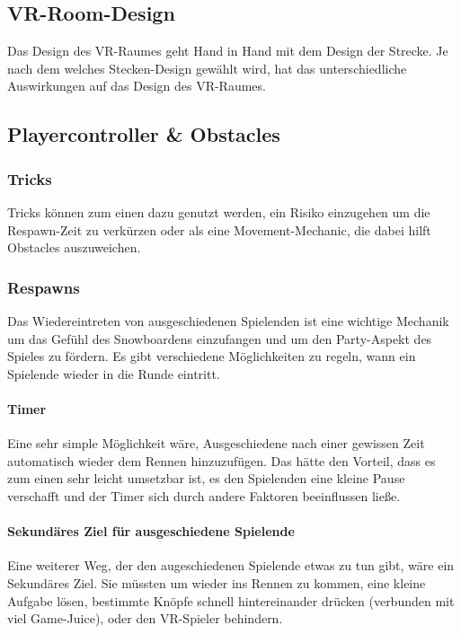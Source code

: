 \subsection{VR-Room-Design}

Das Design des VR-Raumes geht Hand in Hand mit dem Design der Strecke. Je nach dem welches Stecken-Design gewählt wird, hat das unterschiedliche Auswirkungen auf das Design des VR-Raumes.

\subsection{Playercontroller \& Obstacles\label{_playercontroller}}
\subsubsection{Tricks}
Tricks können zum einen dazu genutzt werden, ein Risiko einzugehen um die Respawn-Zeit zu verkürzen oder als eine Movement-Mechanic, die dabei hilft Obstacles auszuweichen.

\subsubsection{Respawns}
Das Wiedereintreten von ausgeschiedenen Spielenden ist eine wichtige Mechanik um das Gefühl des Snowboardens einzufangen und um den Party-Aspekt des Spieles zu fördern. Es gibt verschiedene Möglichkeiten zu regeln, wann ein Spielende wieder in die Runde eintritt.

\paragraph{Timer}
Eine sehr simple Möglichkeit wäre, Ausgeschiedene nach einer gewissen Zeit automatisch wieder dem Rennen hinzuzufügen. Das hätte den Vorteil, dass es zum einen sehr leicht umsetzbar ist, es den Spielenden eine kleine Pause verschafft und der Timer sich durch andere Faktoren beeinflussen ließe.

\paragraph{Sekundäres Ziel für ausgeschiedene Spielende}
Eine weiterer Weg, der den augeschiedenen Spielende etwas zu tun gibt, wäre ein Sekundäres Ziel. Sie müssten um wieder ins Rennen zu kommen, eine kleine Aufgabe lösen, bestimmte Knöpfe schnell hintereinander drücken (verbunden mit viel Game-Juice), oder den VR-Spieler behindern.

